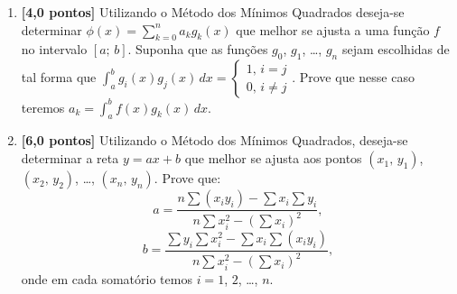 \documentclass[12pt,a4paper]{article}
\begin{document}
\begin{enumerate}
 \item \textbf{[4,0 pontos]} Utilizando o Método dos Mínimos Quadrados deseja-se determinar $\displaystyle \phi(x) = \sum_{k=0}^n a_kg_k(x)$ que melhor se ajusta 
a uma função $f$ no intervalo $[a;\, b]$. Suponha que as funções $g_0$, $g_1$, \ldots, $g_n$ sejam escolhidas de tal forma que 
$\displaystyle\int_a^b g_i(x)g_j(x)\,dx = \begin{cases}1,\,i = j \\ 0,\,i\neq j\end{cases}$. Prove que nesse caso teremos 
$a_k = \displaystyle\int_a^b f(x)g_k(x)\,dx$.

  \item \textbf{[6,0 pontos]} Utilizando o Método dos Mínimos Quadrados, deseja-se determinar a reta $y = ax + b$ que 
melhor se ajusta aos pontos $(x_1,\,y_1)$, $(x_2,\,y_2)$, \ldots, $(x_n,\,y_n)$. Prove que:
$$a = \dfrac{\displaystyle n\sum (x_iy_i) - \sum x_i\sum y_i}{\displaystyle n\sum x_i^2 - \left(\sum x_i\right)^2},$$
$$b = \dfrac{\displaystyle \sum y_i\sum x_i^2 - \sum x_i\sum (x_iy_i)}{\displaystyle n\sum x_i^2 - \left(\sum x_i\right)^2},$$
onde em cada somatório temos $i = 1$, $2$, \ldots, $n$.
\end{enumerate}
\end{document}
